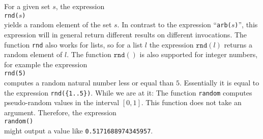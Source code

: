 For a given set $s$, the expression
\\[0.2cm]
\hspace*{1.3cm}
\texttt{rnd($s$)}
\\[0.2cm]
yields a random element of the set $s$.  
In contrast to the expression
``\texttt{arb($s$)}'',  this expression will in general return different results on
different invocations.  The function \texttt{rnd} also works for lists, so for a list $l$
the expression $\texttt{rnd}(l)$ returns a random element of $l$.
The function $\mathtt{rnd}()$ is also supported for integer numbers, for example the expression
\\[0.2cm]
\hspace*{1.3cm}
\texttt{rnd(5)}
\\[0.2cm]
computes a random natural number less or equal than $5$. Essentially it is equal to the expression
\texttt{rnd(\{1..5\})}.  While we are at it: The function \texttt{random} computes pseudo-random
values in the interval $[0,1]$.  This function does not take an argument. Therefore, the expression
\\[0.2cm]
\hspace*{1.3cm}
\texttt{random()}
\\[0.2cm]
might output a value like \texttt{0.5171688974345957}. 


